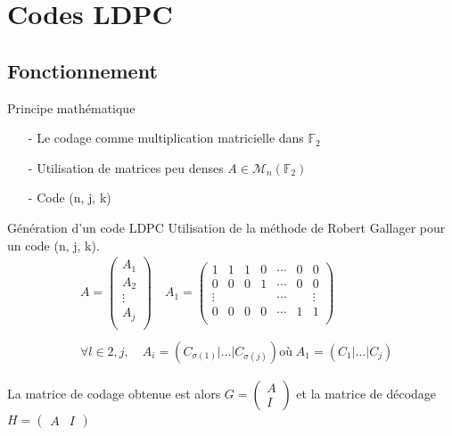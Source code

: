 \documentclass[11pt]{beamer}
\begin{document}
\section{Codes LDPC}
\subsection{Fonctionnement}


\begin{frame}{Principe math\'ematique}
	\begin{itemize}
		\item[-] Le codage comme multiplication matricielle dans $\mathbb{F}_2$
		\item[-] Utilisation de matrices peu denses $A \in \mathcal{M}_n(\mathbb{F}_2)$
		\item[-] Code (n, j, k)
	\end{itemize}
\end{frame}

\begin{frame}{G\'en\'eration d'un code LDPC}
	Utilisation de la m\'ethode de Robert Gallager pour un code (n, j, k).
	\begin{equation*}
	\begin{split}
	& A =
	\begin{pmatrix}
	A_1 \\
	A_2 \\
	\vdots \\
	A_j	\\ \end{pmatrix} \quad
	A_1 =
	\begin{pmatrix}
	1 & 1 & 1 & 0 & \cdots & 0 & 0 \\
	0 & 0 & 0 & 1 & \cdots & 0 & 0 \\
	\vdots & & & & \cdots & & \vdots \\ 
	0 & 0 & 0 & 0 & \cdots & 1 & 1 \\ \end{pmatrix}\\ & \\
	& \forall l \in {2, j}, \quad A_i = \left(C_{\sigma(1)}|\ldots|C_{\sigma(j)}\right) \text{o\`u} \; A_1 = \left(C_1|\ldots|C_j\right)
	\end{split}
	\end{equation*}

	La matrice de codage obtenue est alors $G = \begin{pmatrix} A \\ I \end{pmatrix}$ et la matrice de d\'ecodage $H = \begin{pmatrix} A & I \end{pmatrix}$
\end{frame}
\end{document}
